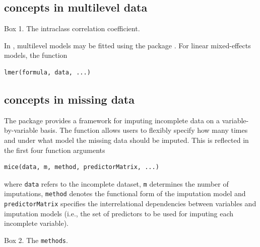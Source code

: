\documentclass[
  article]{jss}
\newcommand{\fct}[1]{\code{#1()}}
\begin{document}
\hypertarget{concepts-in-multilevel-data}{%
\subsection{concepts in multilevel
data}\label{concepts-in-multilevel-data}}

\begin{tcolorbox}[enhanced jigsaw, bottomrule=.15mm, breakable, arc=.35mm, colback=white, left=2mm, toprule=.15mm, rightrule=.15mm, leftrule=.75mm, opacityback=0]

Box 1. The intraclass correlation coefficient.

\end{tcolorbox}

In , multilevel models may be fitted using the package
. For linear mixed-effects models, the function

\begin{verbatim}
lmer(formula, data, ...)
\end{verbatim}

\hypertarget{concepts-in-missing-data}{%
\subsection{concepts in missing data}\label{concepts-in-missing-data}}

The  package  provides a framework for imputing
incomplete data on a variable-by-variable basis. The \fct{mice} function
allows users to flexibly specify how many times and under what model the
missing data should be imputed. This is reflected in the first four
function arguments

\begin{verbatim}
mice(data, m, method, predictorMatrix, ...)
\end{verbatim}

where \texttt{data} refers to the incomplete dataset, \texttt{m}
determines the number of imputations, \texttt{method} denotes the
functional form of the imputation model and \texttt{predictorMatrix}
specifies the interrelational dependencies between variables and
imputation models (i.e., the set of predictors to be used for imputing
each incomplete variable).

\begin{tcolorbox}[enhanced jigsaw, bottomrule=.15mm, breakable, arc=.35mm, colback=white, left=2mm, toprule=.15mm, rightrule=.15mm, leftrule=.75mm, opacityback=0]

Box 2. The \texttt{methods}.

\end{tcolorbox}
\end{document}
